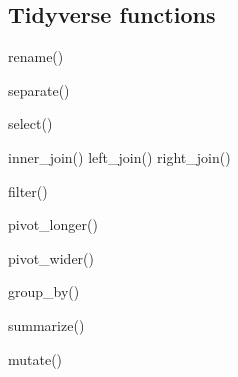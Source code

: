 \documentclass[
  letterpaper,
  DIV=11,
  numbers=noendperiod]{scrartcl}
\begin{document}
\hypertarget{tidyverse-functions}{%
\subsection{Tidyverse functions}\label{tidyverse-functions}}

rename()

separate()

select()

inner\_join() left\_join() right\_join()

filter()

pivot\_longer()

pivot\_wider()

group\_by()

summarize()

mutate()
\end{document}
